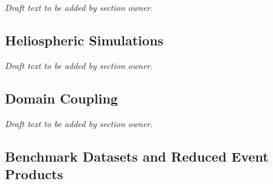 \documentclass[
  draft
]{agujournal2025}
\begin{document}
\noindent\textit{Draft text to be added by section owner.}

\subsection{Heliospheric Simulations}

\noindent\textit{Draft text to be added by section owner.}

\subsection{Domain Coupling}

\noindent\textit{Draft text to be added by section owner.}

\subsection{Benchmark Datasets and Reduced Event Products}
\end{document}
